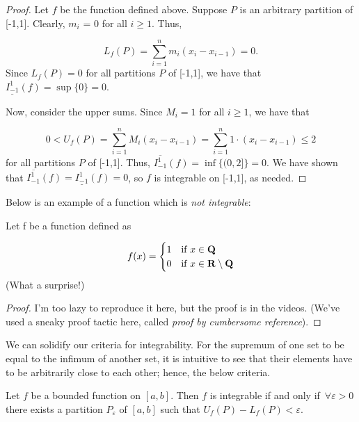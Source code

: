 \documentclass{article}
\begin{document}
  \begin{proof}
    Let \(f\) be the function defined above. Suppose \(P\) is an arbitrary partition of [-1,1]. Clearly, \(m_i\) = 0 for all \(i \geq 1\). Thus,

    \[
      L_f(P) = \sum_{i = 1}^{n}{m_i(x_i - x_{i-1})} = 0.
    \]
    Since \(L_f(P) = 0\) for all partitions \(P\) of [-1,1], we have that \(\underline{I_{-1}^{1}}(f) = \sup\{0\} = 0\).

    Now, consider the upper sums. Since \(M_i = 1\) for all \(i \geq 1\), we have that

    \[
      0 < U_f(P) = \sum_{i = 1}^{n}{M_i(x_i - x_{i-1})} = \sum_{i = 1}^{n}{1 \cdot (x_i - x_{i-1})} \leq 2
    \]
    for all partitions \(P\) of [-1,1]. Thus, \(\overline{I_{-1}^{1}}(f) = \inf\{(0,2]\} = 0\).
    We have shown that \(\overline{I_{-1}^{1}}(f) = \underline{I_{-1}^{1}}(f) = 0\), so \(f\) is integrable on [-1,1], as needed.
  \end{proof}

  Below is an example of a function which is \emph{not integrable}:

  \begin{eg}
    Let f be a function defined as 

    \[
      f(x) = \begin{cases}
        1 & \text{if } x \in \mathbf{Q} \\
        0 & \text{if } x \in \mathbf{R} \setminus \mathbf{Q}
      \end{cases}
    \]
    (What a surprise!)

    \begin{proof}
      I'm too lazy to reproduce it here, but the proof is in the videos. (We've used a sneaky proof tactic here, called \emph{proof by cumbersome reference}).
    \end{proof}
    
  \end{eg} 

  We can solidify our criteria for integrability. For the supremum of one set to be equal to the infimum of another set, it is intuitive to see that their elements have to be arbitrarily close to each other; hence, the below criteria.
  \begin{defi}
    Let \(f\) be a bounded function on \([a,b]\). Then \(f\) is integrable if and only if \(\, \forall \varepsilon > 0 \) there exists a partition \(P_{\varepsilon}\) of \([a,b]\) such that \(U_f(P) - L_f(P) < \varepsilon\).
  \end{defi}
\end{document}
